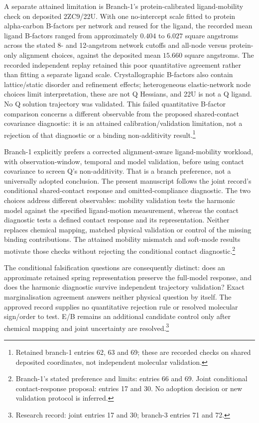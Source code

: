 \documentclass{article}
\begin{document}
A separate attained limitation is Branch-1's protein-calibrated ligand-mobility check on deposited 2ZC9/22U. With one no-intercept scale fitted to protein alpha-carbon B-factors per network and reused for the ligand, the recorded mean ligand B-factors ranged from approximately \(0.404\) to \(6.027\) square angstroms across the stated 8- and 12-angstrom network cutoffs and all-node versus protein-only alignment choices, against the deposited mean \(15.660\) square angstroms. The recorded independent replay retained this poor quantitative agreement rather than fitting a separate ligand scale. Crystallographic B-factors also contain lattice/static disorder and refinement effects; heterogeneous elastic-network node choices limit interpretation, these are not Q Hessians, and 22U is not a Q ligand. No Q solution trajectory was validated. This failed quantitative B-factor comparison concerns a different observable from the proposed shared-contact covariance diagnostic: it is an attained calibration/validation limitation, not a rejection of that diagnostic or a binding non-additivity result.\footnote{Retained branch-1 entries 62, 63 and 69; these are recorded checks on shared deposited coordinates, not independent molecular validation.}

Branch-1 explicitly prefers a corrected alignment-aware ligand-mobility workload, with observation-window, temporal and model validation, before using contact covariance to screen Q's non-additivity. That is a branch preference, not a universally adopted conclusion. The present manuscript follows the joint record's conditional shared-contact response and omitted-compliance diagnostic. The two choices address different observables: mobility validation tests the harmonic model against the specified ligand-motion measurement, whereas the contact diagnostic tests a defined contact response and its representation. Neither replaces chemical mapping, matched physical validation or control of the missing binding contributions. The attained mobility mismatch and soft-mode results motivate those checks without rejecting the conditional contact diagnostic.\footnote{Branch-1's stated preference and limits: entries 66 and 69. Joint conditional contact-response proposal: entries 17 and 30. No adoption decision or new validation protocol is inferred.}

The conditional falsification questions are consequently distinct: does an approximate retained spring representation preserve the full-model response, and does the harmonic diagnostic survive independent trajectory validation? Exact marginalisation agreement answers neither physical question by itself. The approved record supplies no quantitative rejection rule or resolved molecular sign/order to test. E/B remains an additional candidate control only after chemical mapping and joint uncertainty are resolved.\footnote{Research record: joint entries 17 and 30; branch-3 entries 71 and 72.}
\end{document}
